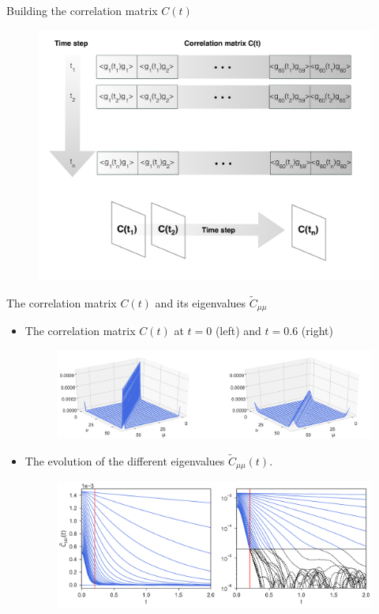 \documentclass{beamer}
\begin{document}
 \begin{frame}{Building the correlation matrix $C(t)$}
\begin{figure}[h!]
\includegraphics[width=\linewidth]{lammps-python}
\end{figure}
 \end{frame}
 
 \begin{frame}{The correlation matrix $C(t)$ and its eigenvalues $\tilde{C}_{\mu\mu}$}
   \begin{itemize}
 \item
   The correlation matrix $C(t)$ at $t=0$ (left) and $t=0.6$ (right)
\begin{figure}[h!]
\includegraphics[width=\linewidth]{Ct-matrix-PBC}
\end{figure}
\item  The evolution of the different eigenvalues $\tilde{C}_{\mu\mu}(t)$. %
\begin{figure}[h!]
  \includegraphics[width=\linewidth]{CtFourier-PBC-exp}
\end{figure}
\end{itemize}
\end{frame}
\end{document}
